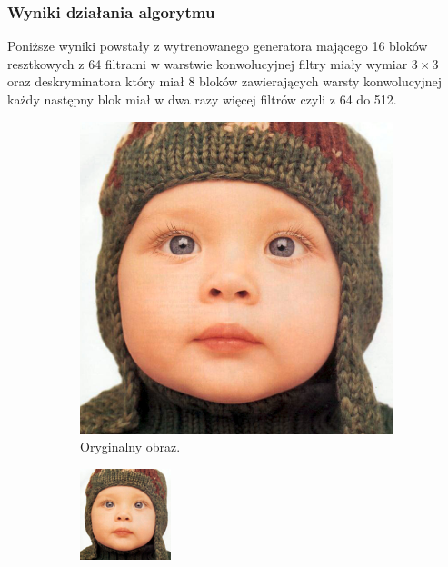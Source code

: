 \documentclass[a4paper,11pt, notitlepage ]{article}
\begin{document}
\subsubsection{Wyniki działania algorytmu}
Poniższe wyniki powstały z wytrenowanego generatora mającego 16 bloków resztkowych z 64 filtrami w warstwie konwolucyjnej  filtry miały wymiar $3 \times 3$ oraz deskryminatora który miał 8 bloków zawierających warsty konwolucyjnej każdy następny blok miał w dwa razy więcej filtrów czyli z 64 do 512.
\begin{figure}[h!]
	\centering
	\begin{subfigure}[b]{0.4\linewidth}
		\includegraphics[width=\linewidth]{baby_GT.png}
		\caption{Oryginalny obraz.}
	\end{subfigure}
	\begin{subfigure}[b]{0.4\linewidth}
		\includegraphics[width=\linewidth]{SRGAN/test.png}

\end{subfigure}
\end{figure}
\end{document}
